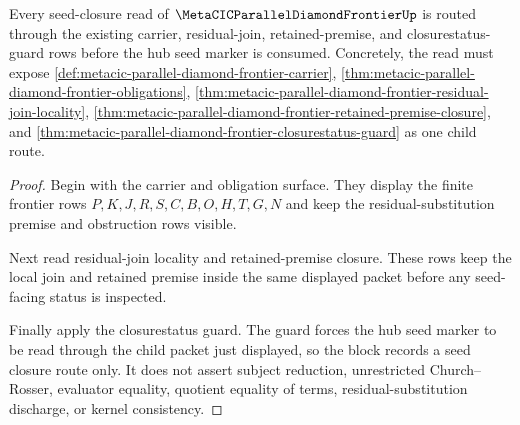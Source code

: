 \begin{theorem}
\label{thm:metacic-parallel-diamond-frontier-seed-closure-block-sync}
Every seed-closure read of $\MetaCICParallelDiamondFrontierUp$ is routed through the existing carrier, residual-join, retained-premise, and closurestatus-guard rows before the hub seed marker is consumed. Concretely, the read must expose \autoref{def:metacic-parallel-diamond-frontier-carrier}, \autoref{thm:metacic-parallel-diamond-frontier-obligations}, \autoref{thm:metacic-parallel-diamond-frontier-residual-join-locality}, \autoref{thm:metacic-parallel-diamond-frontier-retained-premise-closure}, and \autoref{thm:metacic-parallel-diamond-frontier-closurestatus-guard} as one child route.
\end{theorem}
\begin{proof}
Begin with the carrier and obligation surface. They display the finite frontier rows $P,K,J,R,S,C,B,O,H,T,G,N$ and keep the residual-substitution premise and obstruction rows visible.

Next read residual-join locality and retained-premise closure. These rows keep the local join and retained premise inside the same displayed packet before any seed-facing status is inspected.

Finally apply the closurestatus guard. The guard forces the hub seed marker to be read through the child packet just displayed, so the block records a seed closure route only. It does not assert subject reduction, unrestricted Church--Rosser, evaluator equality, quotient equality of terms, residual-substitution discharge, or kernel consistency.
\end{proof}
